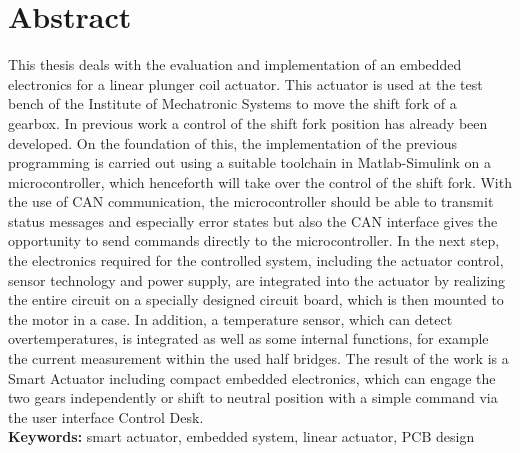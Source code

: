 \documentclass[nochapterpage,bigchapter,linedtoc,longdoc,colorback,accentcolor=tud1c]{tudreport}
\begin{document}
\section*{Abstract}
This thesis deals with the evaluation and implementation of an embedded electronics for a linear plunger coil actuator.  This actuator is used at the test bench of the Institute of Mechatronic Systems to move the shift fork of a gearbox.
In previous work a control of the shift fork position has already been developed. On the foundation of this, the implementation of the previous programming is carried out using a suitable toolchain in Matlab-Simulink on a microcontroller, which henceforth will take over the control of the shift fork. With the use of CAN communication, the microcontroller should be able to transmit status messages and especially error states but also the CAN interface gives the opportunity to send commands directly to the microcontroller. In the next step, the electronics required for the controlled system, including the actuator control, sensor technology and power supply, are integrated into the actuator by realizing the entire circuit on a specially designed circuit board, which is then mounted to the motor in a case. In addition, a temperature sensor, which can detect overtemperatures, is integrated as well as some internal functions, for example the current measurement within the used half bridges.  The result of the work is a Smart Actuator including compact embedded electronics, which can engage the two gears independently or shift to neutral position with a simple command via the user interface Control Desk.\\

\textbf{Keywords:} smart actuator, embedded system, linear actuator, PCB design\newpage
\listoffigures{}
\tableofcontents{}
\newpage
{}









\printbibliography
\end{document}
